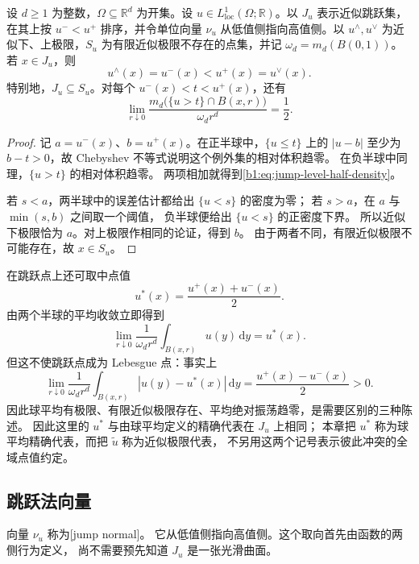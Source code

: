 \begin{proposition}\label{b1:prop:jump-approximate-limits}
设 \(d\ge1\) 为整数，\(\Omega\subseteq\mathbb R^d\) 为开集。设 \(u\in L^1_{\mathrm{loc}}(\Omega;\mathbb R)\)。以 \(J_u\) 表示近似跳跃集，在其上按 \(u^-<u^+\) 排序，并令单位向量 \(\nu_u\) 从低值侧指向高值侧。以 \(u^\wedge,u^\vee\) 为近似下、上极限，\(S_u\) 为有限近似极限不存在的点集，并记 \(\omega_d=m_d(B(0,1))\)。若 \(x\in J_u\)，则
\begin{equation}\label{b1:eq:jump-upper-lower-values}
 u^\wedge(x)=u^-(x)<u^+(x)=u^\vee(x).
\end{equation}
特别地，\(J_u\subseteq S_u\)。对每个 \(u^-(x)<t<u^+(x)\)，还有
\begin{equation}\label{b1:eq:jump-level-half-density}
 \lim_{r\downarrow0}
 \frac{m_d\bigl(\{u>t\}\cap B(x,r)\bigr)}{\omega_dr^d}
 =\frac12.
\end{equation}
\end{proposition}
\begin{proof}
记 \(a=u^-(x)\)、\(b=u^+(x)\)。在正半球中，\(\{u\le t\}\) 上的
\(|u-b|\) 至少为 \(b-t>0\)，故 Chebyshev 不等式说明这个例外集的相对体积趋零。
在负半球中同理，\(\{u>t\}\) 的相对体积趋零。
两项相加就得到\eqref{b1:eq:jump-level-half-density}。

若 \(s<a\)，两半球中的误差估计都给出 \(\{u<s\}\) 的密度为零；
若 \(s>a\)，在 \(a\) 与 \(\min(s,b)\) 之间取一个阈值，
负半球便给出 \(\{u<s\}\) 的正密度下界。
所以近似下极限恰为 \(a\)。对上极限作相同的论证，得到 \(b\)。
由于两者不同，有限近似极限不可能存在，故 \(x\in S_u\)。
\end{proof}

在跳跃点上还可取中点值
\[
 u^*(x)=\frac{u^+(x)+u^-(x)}2.
\]
由两个半球的平均收敛立即得到
\[
 \lim_{r\downarrow0}\frac1{\omega_dr^d}\int_{B(x,r)}u(y)\,\mathrm dy=u^*(x).
\]
但这不使跳跃点成为 Lebesgue 点：事实上
\[
 \lim_{r\downarrow0}\frac1{\omega_dr^d}\int_{B(x,r)}|u(y)-u^*(x)|\,\mathrm dy
 =\frac{u^+(x)-u^-(x)}2>0.
\]
因此球平均有极限、有限近似极限存在、平均绝对振荡趋零，是需要区别的三种陈述。
因此这里的 \(u^*\) 与由球平均定义的精确代表在 \(J_u\) 上相同；
本章把 \(u^*\) 称为球平均精确代表，而把 \(\widetilde u\) 称为近似极限代表，
不另用这两个记号表示彼此冲突的全域点值约定。

\subsection{跳跃法向量}
\label{b1:subsec:280203}

向量 \(\nu_u\) 称为[jump normal]。
它从低值侧指向高值侧。这个取向首先由函数的两侧行为定义，
尚不需要预先知道 \(J_u\) 是一张光滑曲面。

